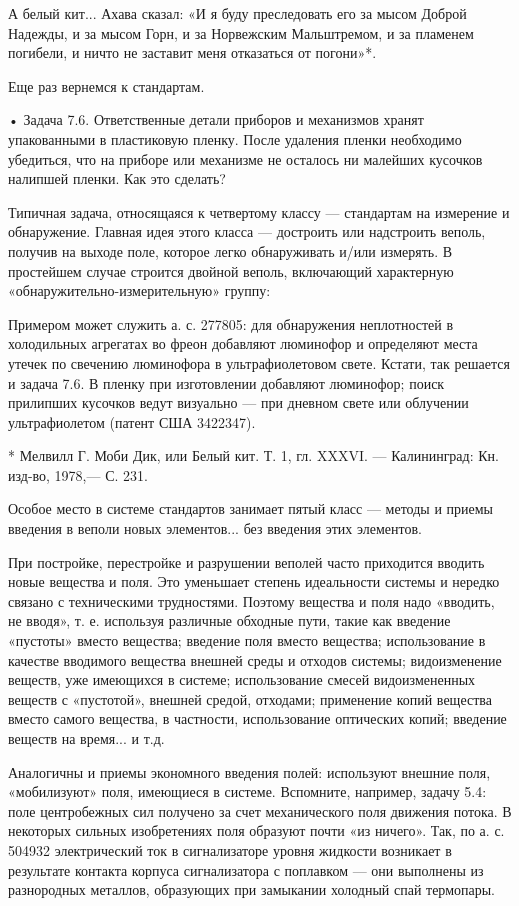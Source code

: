 А  белый кит...  Ахава сказал:  «И я  буду преследовать  его за  мысом
Доброй Надежды,  и за мысом  Горн, и  за Норвежским Мальштремом,  и за
пламенем погибели, и ничто не заставит меня отказаться от погони»*.


Еще раз вернемся к стандартам.

•  Задача  7.6.  Ответственные  детали приборов  и  механизмов  хранят
упакованными в  пластиковую пленку.  После удаления  пленки необходимо
убедиться,  что  на приборе  или  механизме  не осталось  ни  малейших
кусочков налипшей пленки. Как это сделать?

Типичная  задача,  относящаяся к  четвертому  классу  — стандартам  на
измерение и  обнаружение. Главная  идея этого  класса —  достроить или
надстроить веполь, получив на  выходе поле, которое легко обнаруживать
и/или  измерять.   В  простейшем   случае  строится   двойной  веполь,
включающий характерную «обнаружительно-измерительную» группу:


Примером может  служить а. с.  277805: для обнаружения  неплотностей в
холодильных агрегатах во фреон  добавляют люминофор и определяют места
утечек по  свечению люминофора  в ультрафиолетовом свете.  Кстати, так
решается и задача 7.6. В  пленку при изготовлении добавляют люминофор;
поиск  прилипших кусочков  ведут  визуально —  при  дневном свете  или
облучении ультрафиолетом (патент США 3422347).

* Мелвилл Г. Моби Дик, или Белый  кит. Т. 1, гл. XXXVI. — Калининград:
Кн. изд-во, 1978,— С. 231.


Особое  место  в системе  стандартов  занимает  пятый класс  —  методы
и  приемы  введения в  веполи  новых  элементов... без  введения  этих
элементов.

При  постройке,  перестройке  и разрушении  веполей  часто  приходится
вводить  новые  вещества и  поля.  Это  уменьшает степень  идеальности
системы и нередко связано с техническими трудностями. Поэтому вещества
и поля  надо «вводить, не  вводя», т. е. используя  различные обходные
пути,  такие как  введение  «пустоты» вместо  вещества; введение  поля
вместо вещества;  использование в качестве вводимого  вещества внешней
среды  и  отходов  системы;  видоизменение веществ,  уже  имеющихся  в
системе;  использование смесей  видоизмененных  веществ с  «пустотой»,
внешней  средой, отходами;  применение  копий  вещества вместо  самого
вещества,  в  частности,   использование  оптических  копий;  введение
веществ на время... и т.д.

Аналогичны  и приемы  экономного  введения  полей: используют  внешние
поля,  «мобилизуют» поля,  имеющиеся в  системе. Вспомните,  например,
задачу 5.4: поле центробежных сил  получено за счет механического поля
движения потока. В некоторых  сильных изобретениях поля образуют почти
«из ничего».  Так, по а.  с. 504932 электрический ток  в сигнализаторе
уровня жидкости возникает в  результате контакта корпуса сигнализатора
с поплавком  — они выполнены  из разнородных металлов,  образующих при
замыкании холодный спай термопары.

